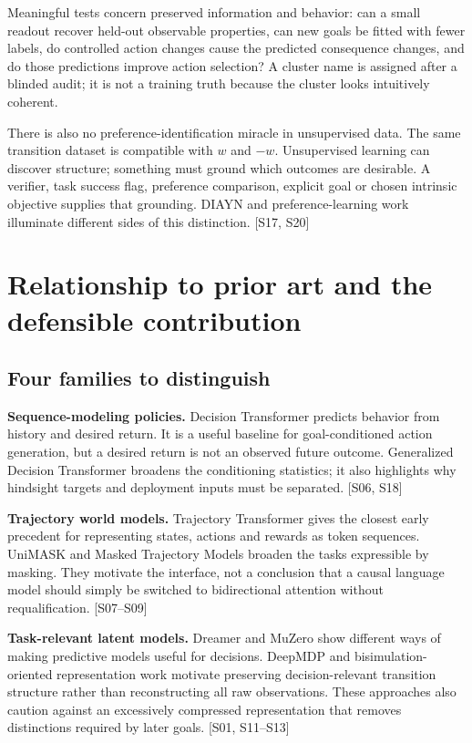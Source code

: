 \documentclass[
  11pt,
  a4paper,
]{article}
\begin{document}
Meaningful tests concern preserved information and behavior: can a small
readout recover held-out observable properties, can new goals be fitted
with fewer labels, do controlled action changes cause the predicted
consequence changes, and do those predictions improve action selection?
A cluster name is assigned after a blinded audit; it is not a training
truth because the cluster looks intuitively coherent.

There is also no preference-identification miracle in unsupervised data.
The same transition dataset is compatible with \(w\) and \(-w\).
Unsupervised learning can discover structure; something must ground
which outcomes are desirable. A verifier, task success flag, preference
comparison, explicit goal or chosen intrinsic objective supplies that
grounding. DIAYN and preference-learning work illuminate different sides
of this distinction. {[}S17, S20{]}

\section{Relationship to prior art and the defensible
contribution}\label{relationship-to-prior-art-and-the-defensible-contribution}

\subsection{Four families to
distinguish}\label{four-families-to-distinguish}

\textbf{Sequence-modeling policies.} Decision Transformer predicts
behavior from history and desired return. It is a useful baseline for
goal-conditioned action generation, but a desired return is not an
observed future outcome. Generalized Decision Transformer broadens the
conditioning statistics; it also highlights why hindsight targets and
deployment inputs must be separated. {[}S06, S18{]}

\textbf{Trajectory world models.} Trajectory Transformer gives the
closest early precedent for representing states, actions and rewards as
token sequences. UniMASK and Masked Trajectory Models broaden the tasks
expressible by masking. They motivate the interface, not a conclusion
that a causal language model should simply be switched to bidirectional
attention without requalification. {[}S07--S09{]}

\textbf{Task-relevant latent models.} Dreamer and MuZero show different
ways of making predictive models useful for decisions. DeepMDP and
bisimulation-oriented representation work motivate preserving
decision-relevant transition structure rather than reconstructing all
raw observations. These approaches also caution against an excessively
compressed representation that removes distinctions required by later
goals. {[}S01, S11--S13{]}
\end{document}
